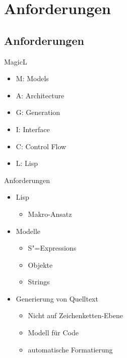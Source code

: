 \documentclass{beamer}
\newcommand{\sexps}{S"=Expressions}
\begin{document}
\section{Anforderungen}
\subsection{Anforderungen}

\begin{frame}{MagicL}
  \begin{itemize}
  \item M: Models
  \item A: Architecture
  \item G: Generation
  \item I: Interface
  \item C: Control Flow
  \item L: Lisp
  \end{itemize}
\end{frame}

\begin{frame}{Anforderungen}
  \begin{itemize}
  \item Lisp
    \begin{itemize}
    \item Makro-Ansatz
    \end{itemize}
  \item Modelle
    \begin{itemize}
    \item \sexps{}
    \item Objekte
    \item Strings
    \end{itemize}
  \item Generierung von Quelltext
    \begin{itemize}
    \item Nicht auf Zeichenketten-Ebene
    \item Modell für Code
    \item automatische Formatierung
    \end{itemize}
  \end{itemize}
\end{frame}
\end{document}
